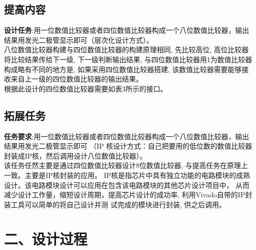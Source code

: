 \documentclass{article}
\newcommand{\fourhao}{\fontsize{14pt}{\baselineskip}\selectfont} %
\newcommand{\xiaosihao}{\fontsize{12pt}{\baselineskip}\selectfont} %
\begin{document}
\subsection*{提高内容}
\textbf{设计任务}:用一位数值比较器或者四位数值比较器构成一个八位数值比较器，输出结果用发光二极管显示即可（层次化设计方式）。\\
八位数值比较器构建与四位数值比较器的构建原理相同, 先比较高位, 高位比较器将比较结果传给下一级, 下一级判断输出结果, 
与四位数值比较器用1为数值比较器构成略有不同的地方是, 如果采用四位数值比较器搭建, 该数值比较器需要能够接收来自上一级的四位数值比较器的输出结果。\\
根据此设计的四位数值比较器需要如表3所示的接口。
\begin{table}[htp]
    \centering
    \caption{四位数值比较器接口}
\end{table}
\subsection*{拓展任务}
\textbf{任务要求}:用一位数值比较器或者四位数值比较器构成一个八位数值比较器，输出结果用发光二极管显示即可
（IP 核设计方式：自己把要用的低位数的数值比较器封装成IP核，然后调用设计八位数值比较器）。\\
该任务任然主要是通过四位数值比较器设计8位数值比较器, 与提高任务在原理上一致。主要是IP核封装的应用。
IP核是指芯片中具有独立功能的电路模块的成熟设计。该电路模块设计可以应用在包含该电路模块的其他芯片设计项目中，
从而减少设计工作量，缩短设计周期，提高芯片设计的成功率, 利用Vivado自带的IP封装工具可以简单的将自己设计并测
试完成的模块进行封装, 供之后调用。
\newpage
\section*{\fourhao 二、设计过程}
\xiaosihao
\end{document}
